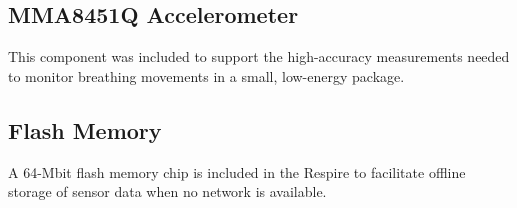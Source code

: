 \subsection{MMA8451Q Accelerometer}
This component was included to support the high-accuracy measurements needed to monitor
breathing movements in a small, low-energy package.

\subsection{Flash Memory}
A 64-Mbit flash memory chip is included in the Respire to facilitate offline storage of sensor data
when no network is available.


